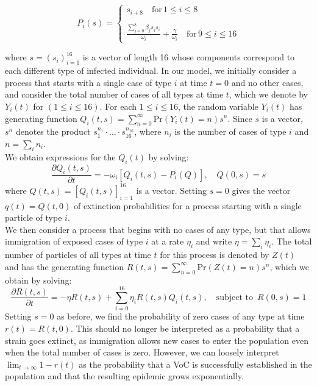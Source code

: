 \documentclass{article}
\begin{document}
\begin{equation} \label{offspring}
P_i(s) =  \begin{cases}
 s_{i+8} \quad \text{for} \, 1 \leq i \leq 8 \\
\\
\frac{\sum_{j=0}^8 \beta_j s_j s_i}{\omega_i} + \frac{\gamma}{\omega_i} \quad \text{for} \, 9 \leq i \leq 16 
\end{cases}
\end{equation}


where $s = (s_i)_{i=1}^{16}$ is a vector of length 16 whose components correspond to each different type of infected individual. In our model, we initially consider a process that starts with a single case of type $i$ at time $t=0$ and no other cases, and consider the total number of cases of all types at time $t$, which we denote by $Y_i(t)$ for $ (1 \leq i \leq 16)$.  For each $1 \leq i \leq 16$, the random variable $Y_i(t)$ has generating function $Q_i(t, s) = \sum_{n=0}^\infty{\mathrm{Pr}}(Y_i(t) = n)s^n$. Since $s$ is a vector, $s^n$ denotes the product $s_1^{n_1} \cdot \dots \cdot s_{16}^{n_{16}}$, where $n_i$ is the number of cases of type $i$ and $n = \sum_i n_i$. \\ 

We obtain expressions for the $Q_i(t)$ by solving:
\begin{equation}
    \frac{\partial Q_i(t, s)}{\partial t} = -\omega_i[Q_i(t, s) - P_i(Q)], \quad Q(0, s) = s \label{Qeq}
\end{equation}
where $Q(t, s) = [Q_i(t, s)]_{i=1}^{16}$ is a vector. Setting $s=0$ gives the vector  $q(t) = Q(t, 0)$ of extinction probabilities for a process starting with a single particle of type $i$. \\

We then consider a process that begins with no cases of any type, but that allows immigration of exposed cases of type $i$ at a rate $\eta_i$ and write $\eta = \sum_i \eta_i$. The total number of particles of all types at time $t$ for this process is denoted by $Z(t)$ and has the generating function $R(t, s) = \sum_{n=0}^\infty {\mathrm{Pr}}(Z(t) = n)s^n$, which we obtain by solving:
\begin{equation}
    \frac{\partial R(t, s)}{\partial t} = -\eta R(t, s) + \sum_{i=0}^{16} \eta_i R(t, s)Q_i(t, s), \quad \text{subject to }\, R(0, s) = 1 \label{Req}
\end{equation}
Setting $s=0$ as before, we find the probability of zero cases of any type at time $r(t) = R(t, 0)$. This should no longer be interpreted as a probability that a strain goes extinct, as immigration allows new cases to enter the population even when the total number of cases is zero. However, we can loosely interpret $\lim_{t \to \infty}1 - r(t)$ as the probability that a VoC is successfully established in the population and that the resulting epidemic grows exponentially. 
\end{document}

